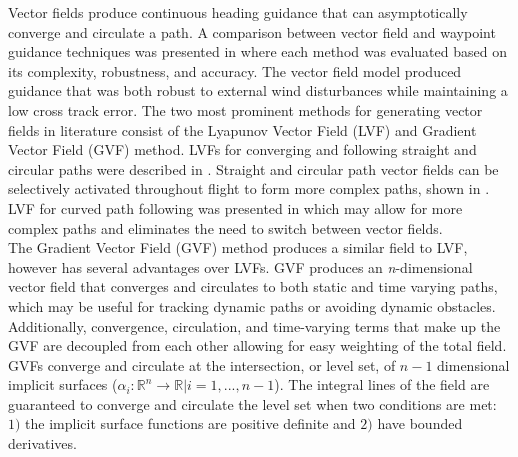 \documentclass[conf]{new-aiaa}
\begin{document}

Vector fields produce continuous heading guidance that can asymptotically converge and circulate a path. A comparison between vector field and waypoint guidance techniques was presented in \cite{sujit_unmanned_2014} where each method was evaluated based on its complexity, robustness, and accuracy. The vector field model produced guidance that was both robust to external wind disturbances while maintaining a low cross track error. The two most prominent methods for generating vector fields in literature consist of the Lyapunov Vector Field (LVF) \cite{nelson_cooperative_2005,nelson_vector_2006,nelson_vector_2007,frew_cooperative_2007,miao_orthogonal_2016,griffiths_vector_2006} and Gradient Vector Field (GVF) \cite{goncalves_artificial_2009,goncalves_circulation_2010,goncalves_vector_2010,gerlach_autonomous_2014} method. LVFs for converging and following straight and circular paths were described in \cite{nelson_cooperative_2005}. Straight and circular path vector fields can be selectively activated throughout flight to form more complex paths, shown in \cite{nelson_cooperative_2005,nelson_vector_2006,nelson_vector_2007,jung_unmanned_2016}. LVF for curved path following was presented in \cite{griffiths_vector_2006} which may allow for more complex paths and eliminates the need to switch between vector fields. \\

The Gradient Vector Field (GVF) method produces a similar field to LVF, however has several advantages over LVFs. GVF produces an \textit{n}-dimensional vector field that converges and circulates to both static and time varying paths, which may be useful for tracking dynamic paths or avoiding dynamic obstacles. Additionally, convergence, circulation, and time-varying terms that make up the GVF are decoupled from each other allowing for easy weighting of the total field. GVFs converge and circulate at the intersection, or level set, of $n-1$ dimensional implicit surfaces ($\alpha_i:\mathbb{R}^n\rightarrow\mathbb{R} | i=1,...,n-1$). The integral lines of the field are guaranteed to converge and circulate the level set when two conditions are met: $1)$ the implicit surface functions are positive definite and $2)$ have bounded derivatives. %
\end{document}
